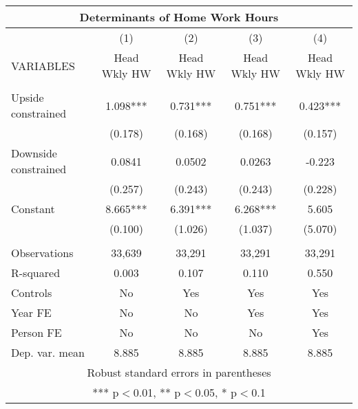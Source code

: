 \begin{tabular}{lcccc}
\multicolumn{5}{c}{Determinants of Home Work Hours} \\ \hline
 & (1) & (2) & (3) & (4) \\
VARIABLES & Head Wkly HW & Head Wkly HW & Head Wkly HW & Head Wkly HW \\ \hline
 &  &  &  &  \\
Upside constrained & 1.098*** & 0.731*** & 0.751*** & 0.423*** \\
 & (0.178) & (0.168) & (0.168) & (0.157) \\
Downside constrained & 0.0841 & 0.0502 & 0.0263 & -0.223 \\
 & (0.257) & (0.243) & (0.243) & (0.228) \\
Constant & 8.665*** & 6.391*** & 6.268*** & 5.605 \\
 & (0.100) & (1.026) & (1.037) & (5.070) \\
 &  &  &  &  \\
Observations & 33,639 & 33,291 & 33,291 & 33,291 \\
R-squared & 0.003 & 0.107 & 0.110 & 0.550 \\
Controls & No & Yes & Yes & Yes \\
Year FE & No & No & Yes & Yes \\
Person FE & No & No & No & Yes \\
 Dep. var. mean & 8.885 & 8.885 & 8.885 & 8.885 \\ \hline
\multicolumn{5}{c}{ Robust standard errors in parentheses} \\
\multicolumn{5}{c}{ *** p$<$0.01, ** p$<$0.05, * p$<$0.1} \\
\end{tabular}
